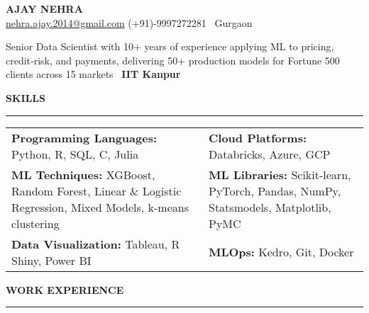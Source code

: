 \documentclass[a4paper,10pt]{article}
\begin{document}
\begin{center}
    \textbf{\LARGE \MakeUppercase{Ajay Nehra}} \\
    \vspace{1mm}
    \href{mailto:nehra.ajay.2014@gmail.com}{nehra.ajay.2014@gmail.com} \hspace{5mm}
    \href{https://www.linkedin.com/in/ajay-n-575bba23/}{\faLinkedin} \hspace{5mm}
    (+91)-9997272281 \hspace{5mm}
    \faMapMarker \, Gurgaon
\end{center}

\vspace{1mm}

{\large
Senior Data Scientist with 10+ years of experience applying ML to pricing, credit‑risk, and payments, delivering 50+ production models for Fortune 500 clients across 15 markets \textbar\ \textbf{IIT Kanpur}
}

\vspace{1mm}

\begin{center}
    \textbf{\LARGE \MakeUppercase{Skills}}\\[-1.2ex]
    \noindent\rule{\textwidth}{0.8pt}
\end{center}

\noindent
\begin{tabular}{p{} p{}}
    \textbf{Programming Languages:} Python, R, SQL, C, Julia & \textbf{Cloud Platforms:} Databricks, Azure, GCP \\
    \textbf{ML Techniques:} XGBoost, Random Forest, Linear \& Logistic Regression, Mixed Models, k-means clustering & \textbf{ML Libraries:} Scikit-learn, PyTorch, Pandas, NumPy, Statsmodels, Matplotlib, PyMC\\
    \textbf{Data Visualization:} Tableau, R Shiny, Power BI & \textbf{MLOps:} Kedro, Git, Docker \\
\end{tabular}

\vspace{1mm}
\begin{center}
    \textbf{\LARGE \MakeUppercase{Work Experience}}\\[-1.2ex]
    \noindent\rule{\textwidth}{0.8pt}
\end{center}
\end{document}
